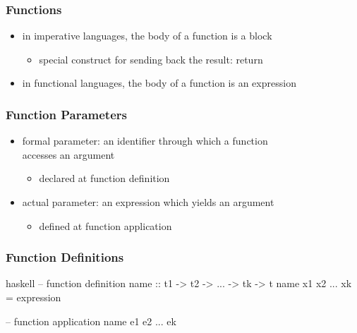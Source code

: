 \documentclass[dvipsnames]{beamer}
\theoremstyle{plain}
\begin{document}
\begin{frame}
  \frametitle{Functions}

  \begin{itemize}
    \item in imperative languages, the body of a function is a block
    \begin{itemize}
      \item special construct for sending back the result: \alert{return}
    \end{itemize}

    \pause
    \bigskip
    \item in functional languages, the body of a function is an expression
  \end{itemize}
\end{frame}

\begin{frame}
  \frametitle{Function Parameters}

  \begin{itemize}
    \item \alert{formal parameter}: an identifier through which a function\\
      accesses an argument
    \begin{itemize}
      \item declared at function definition
    \end{itemize}

    \pause
    \medskip
    \item \alert{actual parameter}: an expression which yields an argument
    \begin{itemize}
      \item defined at function application
    \end{itemize}
  \end{itemize}
\end{frame}

\begin{frame}[fragile]
  \frametitle{Function Definitions}

  \begin{block}{}
    \begin{pygments}{haskell}
-- function definition
name :: t1 -> t2 -> ... -> tk -> t
name x1 x2 ... xk = expression

-- function application
name e1 e2 ... ek
    \end{pygments}
  \end{block}
\end{frame}
\end{document}
